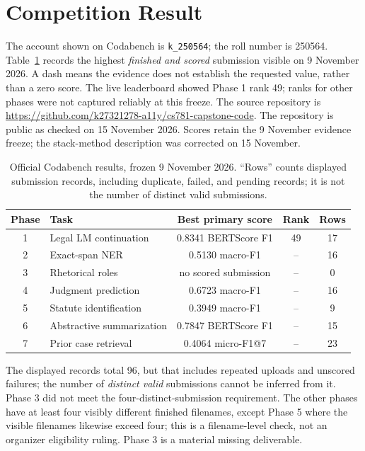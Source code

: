 \documentclass[11pt,oneside]{article}
\begin{document}
\section{Competition Result}
The account shown on Codabench is \texttt{k\_250564}; the roll number is 250564. Table~\ref{tab:official} records the highest \emph{finished and scored} submission visible on 9 November 2026. A dash means the evidence does not establish the requested value, rather than a zero score. The live leaderboard showed Phase 1 rank 49; ranks for other phases were not captured reliably at this freeze.
The source repository is \url{https://github.com/k27321278-a11y/cs781-capstone-code}. The repository is public as checked on 15 November 2026. Scores retain the 9 November evidence freeze; the stack-method description was corrected on 15 November.
\begin{table}[h]
\centering\small
\caption{Official Codabench results, frozen 9 November 2026. ``Rows'' counts displayed submission records, including duplicate, failed, and pending records; it is not the number of distinct valid submissions.}
\label{tab:official}
\begin{tabular}{clccc}
\toprule Phase & Task & Best primary score & Rank & Rows \\\midrule
1 & Legal LM continuation & 0.8341 BERTScore F1 & 49 & 17 \\
2 & Exact-span NER & 0.5130 macro-F1 & -- & 16 \\
3 & Rhetorical roles & no scored submission & -- & 0 \\
4 & Judgment prediction & 0.6723 macro-F1 & -- & 16 \\
5 & Statute identification & 0.3949 macro-F1 & -- & 9 \\
6 & Abstractive summarization & 0.7847 BERTScore F1 & -- & 15 \\
7 & Prior case retrieval & 0.4064 micro-F1@7 & -- & 23 \\
\bottomrule
\end{tabular}
\end{table}
The displayed records total 96, but that includes repeated uploads and unscored failures; the number of \emph{distinct valid} submissions cannot be inferred from it. Phase 3 did not meet the four-distinct-submission requirement. The other phases have at least four visibly different finished filenames, except Phase 5 where the visible filenames likewise exceed four; this is a filename-level check, not an organizer eligibility ruling. Phase 3 is a material missing deliverable.
\end{document}

